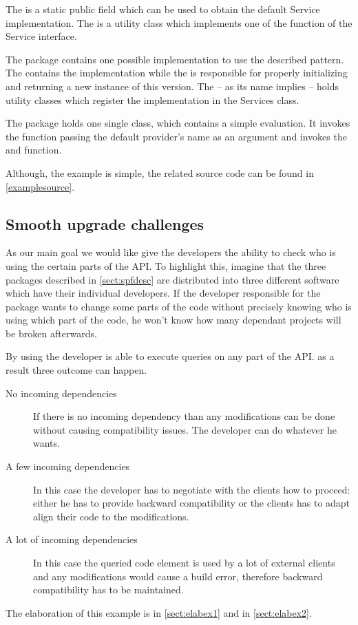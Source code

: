 The  is a static public field which can be used to
obtain the default Service implementation. The  is a
utility class which implements one of the function of the Service interface.

The  package contains one possible implementation to use the
described pattern. The  contains the implementation while the
 is responsible for properly initializing and returning a
new instance of this version. The  -- as its name implies --
holds utility classes which register the implementation in the Services class.

The  package holds one single  class, which contains a
simple evaluation. It invokes the  function passing
the default provider's name as an argument and invokes the  and
 function.

Although, the example is simple, the related source code can be found in
\autoref{examplesource}.

\subsection{Smooth upgrade challenges}
As our main goal we would like give the developers the ability to check who is
using the certain parts of the API. To highlight this, imagine that the three
packages described in \autoref{sect:spfdesc} are distributed into three
different software which have their individual developers. If the developer
responsible for the  package wants to change some parts of the
code without precisely knowing who is using which part of the code, he won't
know how many dependant projects will be broken afterwards. 

By using \ptool{} the developer is able to execute queries on any part of the
API. as a result three outcome can happen.
\begin{description}
  \item[No incoming dependencies] If there is no incoming dependency than any modifications can be done without
causing compatibility issues. The developer can do whatever he wants.
  \item[A few incoming dependencies] In this case the developer has to negotiate
with the clients how to proceed: either he has to provide backward compatibility or the
clients has to adapt align their code to the modifications.
  \item[A lot of incoming dependencies] In this case the queried code
element is used by a lot of external clients and any modifications would cause a build
error, therefore backward compatibility has to be maintained.
\end{description}
The elaboration of this example is in \autoref{sect:elabex1} and in \autoref{sect:elabex2}.